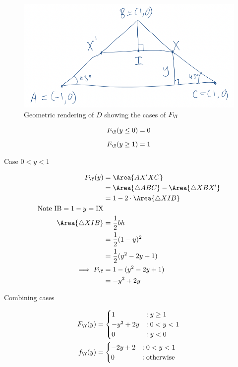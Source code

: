 \begin{figure}[ht]
	\includegraphics[width=1 \textwidth]{Q2c Y diagram.png}
	\caption{Geometric rendering of $D$ showing the cases of $F_\Y$}
	\label{fig:q2c-y}
\end{figure}

\[
F_\Y(y \leq 0) = 0
\]
\[
F_\Y(y \geq 1) = 1
\]

Case $0 < y < 1$

\begin{align*}
F_\Y(y) &= \Area{AX'XC} \\
&= \Area{\triangle ABC} - \Area{\triangle XBX'} \\
&= 1 - 2 \cdot \Area{\triangle XIB} \\
\text{Note } \mathrm{IB} = 1 - y = \mathrm{IX} \\
\Area{\triangle XIB} &= \frac{1}{2}bh \\
&= \frac{1}{2}(1 - y)^2 \\
&= \frac{1}{2}(y^2 - 2y + 1) \\
\implies F_\Y &= 1 - (y^2 - 2y + 1) \\
&= -y^2 + 2y
\end{align*}

Combining cases

\begin{align*}
F_\Y(y) &= \begin{cases}
1 &: y \geq 1 \\
-y^2 +2y &: 0 < y < 1 \\
0 &: y < 0 \\
\end{cases} \\
f_\Y(y) &= \begin{cases}
-2y + 2 &: 0 < y < 1 \\
0 &: \text{otherwise}
\end{cases}
\end{align*}

